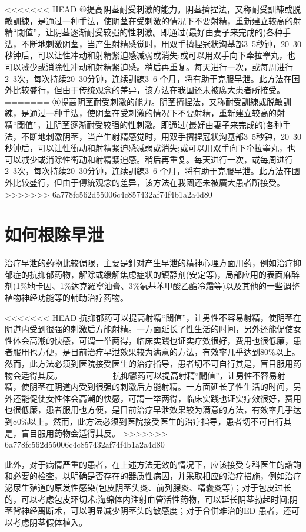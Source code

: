 \documentclass[12pt,UTF8]{ctexbook}
\begin{document}
<<<<<<< HEAD
⑥提高阴茎耐受刺激的能力。阴茎擠捏法，又称耐受訓練或脱敏訓練，是通过一种手法，使阴茎在受刺激的情况下不要射精，重新建立较高的射精“閾值”，让阴茎逐渐耐受较强的性刺激。即通过(最好由妻子来完成的)各种手法，不断地刺激阴茎，当产生射精感觉时，用双手擠捏冠状沟基部3~5秒钟，20~30秒钟后，可以让性冲动和射精紧迫感减弱或消失;或可以用双手向下牵拉睾丸，也可以减少或消除性冲动和射精紧迫感。稍后再重复。每天进行一次，或每周进行2~3次，每次持续20~30分钟，连续訓練3~6 个月，将有助于克服早泄。此方法在国外比较盛行，但由于传统观念的差异，该方法在我国还未被廣大患者所接受。
=======
⑥提高阴茎耐受刺激的能力。阴茎擠捏法，又称耐受訓練或脱敏訓練，是通过一种手法，使阴茎在受刺激的情况下不要射精，重新建立较高的射精“閾值”，让阴茎逐渐耐受较强的性刺激。即通过(最好由妻子来完成的)各种手法，不断地刺激阴茎，当产生射精感觉时，用双手擠捏冠状沟基部3~5秒钟，20~30秒钟后，可以让性衝动和射精紧迫感减弱或消失;或可以用双手向下牵拉睾丸，也可以减少或消除性衝动和射精紧迫感。稍后再重复。每天进行一次，或每周进行2~3次，每次持续20~30分钟，连续訓練3~6 个月，将有助于克服早泄。此方法在國外比较盛行，但由于傳統观念的差异，该方法在我國还未被廣大患者所接受。
>>>>>>> 6a778fc562d55006c4c857432af74f4b1a2a4d80

\section{如何根除早泄}

治疗早泄的药物比较侷限，主要是針对产生早泄的精神心理方面用药，例如治疗抑郁症的抗抑郁药物，解除或缓解焦虑症状的鎮静剂(安定等)，局部应用的表面麻醉剂(1\%地卡因、1\%达克羅寧油膏、3\%氨基苯甲酸乙酯冷霜等)以及其他的一些调整植物神经功能等的輔助治疗药物。

<<<<<<< HEAD
抗抑郁药可以提高射精“閾值”，让男性不容易射精，使阴茎在阴道内受到很强的刺激后方能射精。一方面延长了性生活的时间，另外还能促使女性体会高潮的快感，可谓一举两得，临床实践也证实疗效很好，费用也很低廉，患者服用也方便，是目前治疗早泄效果较为满意的方法，有效率几乎达到80\%以上。然而，此方法必须到医院接受医生的治疗指导，患者切不可自行其是，盲目服用药物会适得其反。
=======
抗抑鬱药可以提高射精“閾值”，让男性不容易射精，使阴茎在阴道内受到很强的刺激后方能射精。一方面延长了性生活的时间，另外还能促使女性体会高潮的快感，可謂一举两得，临床实践也证实疗效很好，费用也很低廉，患者服用也方便，是目前治疗早泄效果较为满意的方法，有效率几乎达到80\%以上。然而，此方法必须到医院接受医生的治疗指导，患者切不可自行其是，盲目服用药物会适得其反。
>>>>>>> 6a778fc562d55006c4c857432af74f4b1a2a4d80

此外，对于病情严重的患者，在上述方法无效的情况下，应该接受专科医生的諮詢和必要的检查，以明确是否存在的器质性病因，并采取相应的治疗措施，例如治疗泌尿生殖道的原发性感染(包皮阴茎头炎、前列腺炎、精囊炎等)；对于包皮过长的，可以考虑包皮环切术;海绵体内注射血管活性药物，可以延长阴茎勃起时间;阴茎背神经离断术，可以明显减少阴茎头的敏感度；对于合併难治的ED 患者，还可以考虑阴茎假体植入。
\end{document}

